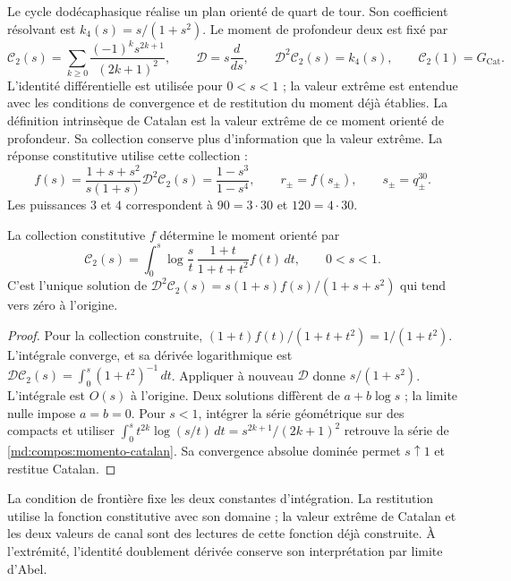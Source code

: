 Le cycle dodécaphasique réalise un plan orienté de quart de tour. Son
coefficient résolvant est $k_4(s)=s/(1+s^2)$. Le moment de profondeur deux
est fixé par
\begin{equation}
 \mathcal C_2(s)=\sum_{k\geq0}
 \frac{(-1)^ks^{2k+1}}{(2k+1)^2},\qquad
 \mathcal D=s\frac{d}{ds},\qquad
 \mathcal D^2\mathcal C_2(s)=k_4(s),\qquad
 \mathcal C_2(1)=G_{\mathrm{Cat}}.
 \label{md:compos:momento-catalan}
\end{equation}
L’identité différentielle est utilisée pour $0<s<1$ ; la valeur extrême est
entendue avec les conditions de convergence et de restitution du moment déjà
établies. La définition intrinsèque de Catalan est la valeur extrême de ce
moment orienté de profondeur. Sa collection conserve plus d’information que
la valeur extrême. La réponse constitutive utilise cette collection :
\begin{equation}
 f(s)=\frac{1+s+s^2}{s(1+s)}\mathcal D^2\mathcal C_2(s)
 =\frac{1-s^3}{1-s^4},\qquad
 r_\pm=f(s_\pm),\qquad s_\pm=q_\pm^{30}.
 \label{md:compos:catalan-respuesta}
\end{equation}
Les puissances $3$ et $4$ correspondent à $90=3\cdot30$ et $120=4\cdot30$.
\begin{proposition}
\label{md:compos:inversa-catalan}
La collection constitutive $f$ détermine le moment orienté par
\[
 \mathcal C_2(s)=\int_0^s\log\frac{s}{t}\,
 \frac{1+t}{1+t+t^2}f(t)\,dt,\qquad 0<s<1.
\]
C’est l’unique solution de
$\mathcal D^2\mathcal C_2(s)=s(1+s)f(s)/(1+s+s^2)$
qui tend vers zéro à l’origine.
\end{proposition}
\begin{proof}
Pour la collection construite,
$(1+t)f(t)/(1+t+t^2)=1/(1+t^2)$. L’intégrale converge, et sa
dérivée logarithmique est
$\mathcal D\mathcal C_2(s)=\int_0^s(1+t^2)^{-1}\,dt$.
Appliquer à nouveau $\mathcal D$ donne $s/(1+s^2)$. L’intégrale est
$O(s)$ à l’origine. Deux solutions diffèrent de $a+b\log s$ ;
la limite nulle impose $a=b=0$.
Pour $s<1$, intégrer la série géométrique sur des compacts et utiliser
$\int_0^s t^{2k}\log(s/t)\,dt=s^{2k+1}/(2k+1)^2$
retrouve la série de \eqref{md:compos:momento-catalan}.
Sa convergence absolue dominée permet $s\uparrow1$ et restitue Catalan.
\end{proof}
La condition de frontière fixe les deux constantes d’intégration.
La restitution utilise la fonction constitutive avec son domaine ; la
valeur extrême de Catalan et les deux valeurs de canal sont des lectures de
cette fonction déjà construite. À l’extrémité, l’identité doublement
dérivée conserve son interprétation par limite d’Abel.

